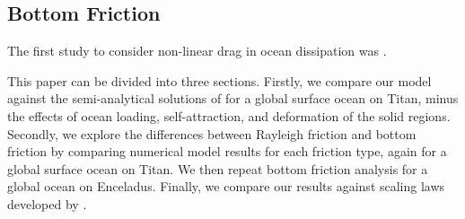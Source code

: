 \subsection{Bottom Friction}

The first study to consider non-linear drag in ocean dissipation was \citet{taylor1920tidal}. 

This paper can be divided into three sections. Firstly, we compare our model against the semi-analytical solutions of \citet{matsuyama2014tidal} for a global surface ocean on Titan, minus the effects of ocean loading, self-attraction, and deformation of the solid regions. Secondly, we explore the differences between Rayleigh friction and bottom friction by comparing numerical model results for each friction type, again for a global surface ocean on Titan. We then repeat bottom friction analysis for a global ocean on Enceladus. Finally, we compare our results against scaling laws developed by \citep{chen2013tidal}.




